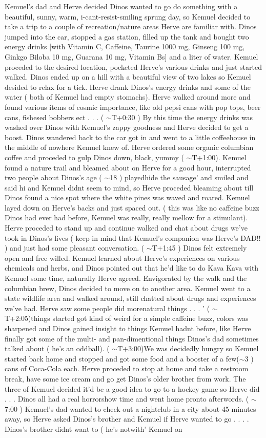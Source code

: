 \documentclass[12pt]{book}
\begin{document}
Kemuel's dad and Herve decided Dinos wanted to go do something with a beautiful, sunny, warm, i-cant-resist-smiling sprung day, so Kemuel decided to take a trip to a couple of recreation/nature areas Herve are familiar with. Dinos jumped into the car, stopped a gas station, filled up the tank and bought two energy drinks [with Vitamin C, Caffeine, Taurine 1000 mg, Ginseng 100 mg, Ginkgo Biloba 10 mg, Guarana 10 mg, Vitamin Bs] and a liter of water. Kemuel proceded to the desired location, pocketed Herve's various drinks and just started walked. Dinos ended up on a hill with a beautiful view of two lakes so Kemuel desided to relax for a tick. Herve drank Dinos's energy drinks and some of the water ( both of Kemuel had empty stomachs). Herve walked around more and found various items of cosmic importance, like old pepsi cans with pop tops, beer cans, fishesed bobbers ect . . .  ( $\sim$T+0:30 ) By this time the energy drinks was washed over Dinos with Kemuel's zappy goodness and Herve decided to get a boost. Dinos wandered back to the car got in and went to a little coffeehouse in the middle of nowhere Kemuel knew of. Herve ordered some organic columbian coffee and proceded to gulp Dinos down, black, yummy ( $\sim$T+1:00). Kemuel found a nature trail and bleamed about on Herve for a good hour, interrupted two people about Dinos's age ( $\sim$18 ) playedhide the sausage' and smiled and said hi and Kemuel didnt seem to mind, so Herve proceded bleaming about till Dinos found a nice spot where the white pines was waved and roared. Kemuel layed down on Herve's backs and just spaced out. ( this was like no caffeine buzz Dinos had ever had before, Kemuel was really, really mellow for a stimulant). Herve proceded to stand up and continue walked and chat about drugs we've took in Dinos's lives ( keep in mind that Kemuel's companion was Herve's DAD!! ) and just had some pleasant conversation. ( $\sim$T+1:45 ) Dinos felt extremely open and free willed. Kemuel learned about Herve's experiences on various chemicals and herbs, and Dinos pointed out that he'd like to do Kava Kava with Kemuel some time, naturally Herve agreed. Envigorated by the walk and the columbian brew, Dinos decided to move on to another area. Kemuel went to a state wildlife area and walked around, still chatted about drugs and experiences we've had. Herve saw some people did morenatural things . . .  ' ( $\sim$T+2:05)things started got kind of weird for a simple caffeine buzz, colors was sharpened and Dinos gained insight to things Kemuel hadnt before, like Herve finally got some of the multi- and pan-dimentional things Dinos's dad sometimes talked about ( he's an oddball). ( $\sim$T+3:00)We was decidedly hungry so Kemuel started back home and stopped and got some food and a booster of a few($\sim$3 ) cans of Coca-Cola each. Herve proceded to stop at home and take a restroom break, have some ice cream and go get Dinos's older brother from work. The three of Kemuel decided it'd be a good idea to go to a hockey game so Herve did . . .  Dinos all had a real horrorshow time and went home pronto afterwords. ( $\sim$7:00 ) Kemuel's dad wanted to check out a nightclub in a city about 45 minutes away, so Herve asked Dinos's brother and Kemuel if Herve wanted to go . . .  . Dinos's brother didnt want to ( he's notwith' Kemuel on 
\end{document}

